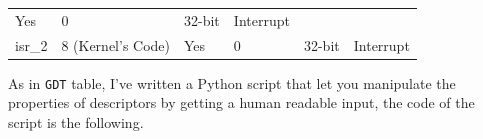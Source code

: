 \begin{longtable}[]{@{}llllll@{}}
\begin{minipage}[t]{0.09\columnwidth}
Yes\strut
\end{minipage} & \begin{minipage}[t]{0.16\columnwidth}\raggedright\strut
0\strut
\end{minipage} & \begin{minipage}[t]{0.16\columnwidth}\raggedright\strut
32-bit\strut
\end{minipage} & \begin{minipage}[t]{0.11\columnwidth}\raggedright\strut
Interrupt\strut
\end{minipage}\tabularnewline
\begin{minipage}[t]{0.15\columnwidth}\raggedright\strut
isr\_2\strut
\end{minipage} & \begin{minipage}[t]{0.18\columnwidth}\raggedright\strut
8 (Kernel's Code)\strut
\end{minipage} & \begin{minipage}[t]{0.09\columnwidth}\raggedright\strut
Yes\strut
\end{minipage} & \begin{minipage}[t]{0.16\columnwidth}\raggedright\strut
0\strut
\end{minipage} & \begin{minipage}[t]{0.16\columnwidth}\raggedright\strut
32-bit\strut
\end{minipage} & \begin{minipage}[t]{0.11\columnwidth}\raggedright\strut
Interrupt\strut
\end{minipage}\tabularnewline
\bottomrule
\end{longtable}

As in \lstinline!GDT! table, I've written a Python script that let you
manipulate the properties of descriptors by getting a human readable
input, the code of the script is the following.

